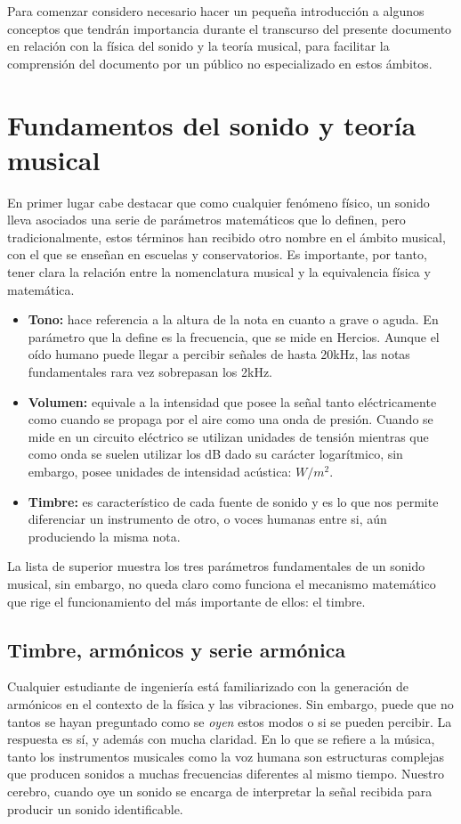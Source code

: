 Para comenzar considero necesario hacer un pequeña introducción a algunos conceptos que tendrán importancia durante el transcurso del presente documento en relación con la física del sonido y la teoría musical, para facilitar la comprensión del documento por un público no especializado en estos ámbitos. 

\section{Fundamentos del sonido y teoría musical}
En primer lugar cabe destacar que como cualquier fenómeno físico, un sonido lleva asociados una serie de parámetros matemáticos que lo definen, pero tradicionalmente, estos términos han recibido otro nombre en el ámbito musical, con el que se enseñan en escuelas y conservatorios. Es importante, por tanto, tener clara la relación entre la nomenclatura musical y la equivalencia física y matemática.
\begin{itemize}
\item \textbf{Tono:} hace referencia a la altura de la nota en cuanto a grave o aguda. En parámetro que la define es la frecuencia, que se mide en Hercios. Aunque el oído humano puede llegar a percibir señales de hasta 20kHz, las notas fundamentales rara vez sobrepasan los 2kHz.
\item \textbf{Volumen:} equivale a la intensidad que posee la señal tanto eléctricamente como cuando se propaga por el aire como una onda de presión. Cuando se mide en un circuito eléctrico se utilizan unidades de tensión mientras que como onda se suelen utilizar los dB dado su carácter logarítmico, sin embargo, posee unidades de intensidad acústica: $W/m^{2}$.
\item\textbf{Timbre:} es característico de cada fuente de sonido y es lo que nos permite diferenciar un instrumento de otro, o voces humanas entre si, aún produciendo la misma nota.
\end{itemize}

La lista de superior muestra los tres parámetros fundamentales de un sonido musical, sin embargo, no queda claro como funciona el mecanismo matemático que rige el funcionamiento del más importante de ellos: el timbre.

\subsection{Timbre, armónicos y serie armónica}
Cualquier estudiante de ingeniería está familiarizado con la generación de armónicos en el contexto de la física y las vibraciones. Sin embargo, puede que no tantos se hayan preguntado como se \emph{oyen} estos modos o si se pueden percibir. La respuesta es sí, y además con mucha claridad. En lo que se refiere a la música, tanto los instrumentos musicales como la voz humana son estructuras complejas que producen sonidos a muchas frecuencias diferentes al mismo tiempo. Nuestro cerebro, cuando oye un sonido se encarga de interpretar la señal recibida para producir un sonido identificable. 

